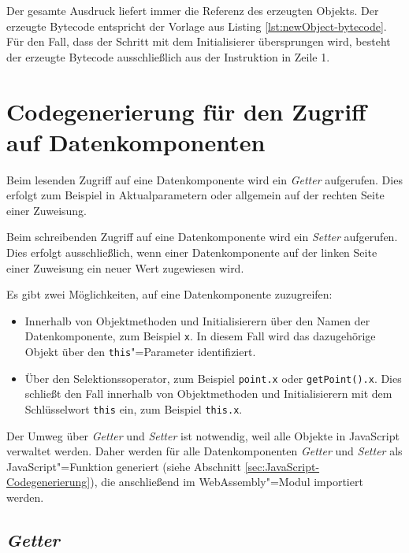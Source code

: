 Der gesamte Ausdruck liefert immer die Referenz des erzeugten Objekts. Der erzeugte Bytecode entspricht der Vorlage aus Listing \ref{lst:newObject-bytecode}. Für den Fall, dass der Schritt mit dem Initialisierer übersprungen wird, besteht der erzeugte Bytecode ausschließlich aus der Instruktion in Zeile 1.

\pagebreak


\section{Codegenerierung für den Zugriff auf Datenkomponenten}
\label{sec:Codegenerierung-für-den-Zugriff-auf-Datenkomponenten}

Beim lesenden Zugriff auf eine Datenkomponente wird ein \emph{Getter} aufgerufen. Dies erfolgt zum Beispiel in Aktualparametern oder allgemein auf der rechten Seite einer Zuweisung.

Beim schreibenden Zugriff auf eine Datenkomponente wird ein \emph{Setter} aufgerufen. Dies erfolgt ausschließlich, wenn einer Datenkomponente auf der linken Seite einer Zuweisung ein neuer Wert zugewiesen wird.

Es gibt zwei Möglichkeiten, auf eine Datenkomponente zuzugreifen:
\begin{itemize}
    \item Innerhalb von Objektmethoden und Initialisierern über den Namen der Datenkomponente, zum Beispiel \lstinline{x}. In diesem Fall wird das dazugehörige Objekt über den \lstinline{this}"=Parameter identifiziert.
    \item Über den Selektionssoperator, zum Beispiel \lstinline{point.x} oder \lstinline{getPoint().x}. Dies schließt den Fall innerhalb von Objektmethoden und Initialisierern mit dem Schlüsselwort \lstinline{this} ein, zum Beispiel \lstinline{this.x}.
\end{itemize}

Der Umweg über \emph{Getter} und \emph{Setter} ist notwendig, weil alle Objekte in JavaScript verwaltet werden. Daher werden für alle Datenkomponenten \emph{Getter} und \emph{Setter} als JavaScript"=Funktion generiert (siehe Abschnitt \ref{sec:JavaScript-Codegenerierung}), die anschließend im WebAssembly"=Modul importiert werden.

\subsection{\emph{Getter}}

